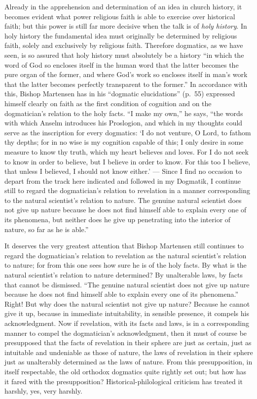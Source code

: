 \documentclass[12pt]{book}
\newcommand{\opage}[1]{\marginnote{\footnotesize\textit{[#1]}}}
\begin{document}
Already in the apprehension and determination of an idea in church history, it becomes evident what power religious faith is able to exercise over historical faith; but this power is still far more decisive when the talk is of \emph{holy history}. In holy history the fundamental idea must originally be determined by religious faith, solely and exclusively by religious faith. Therefore dogmatics, as we have seen, is so assured that holy history must absolutely be a history ``in which the word of God so encloses itself in the human word that the latter becomes the pure organ of the former, and where God's work so encloses itself in man's work that the latter becomes perfectly
\opage{45}\setcounter{footnote}{0}%
transparent to the former.'' In accordance with this, Bishop Martensen has in his ``dogmatic elucidations'' (p.~55) expressed himself clearly on faith as the first condition of cognition and on the dogmatician's relation to the holy facts. ``I make my own,'' he says, ``the words with which Anselm introduces his Proslogion, and which in my thoughts could serve as the inscription for every dogmatics: `I do not venture, O Lord, to fathom thy depths; for in no wise is my cognition capable of this; I only desire in some measure to know thy truth, which my heart believes and loves. For I do not seek to know in order to believe, but I believe in order to know. For this too I believe, that unless I believed, I should not know either.' --- Since I find no occasion to depart from the track here indicated and followed in my Dogmatik, I continue still to regard the dogmatician's relation to revelation in a manner corresponding to the natural scientist's relation to nature. The genuine natural scientist does not give up nature because he does not find himself able to explain every one of its phenomena, but neither does he give up penetrating into the interior of nature, so far as he is able.''

It deserves the very greatest attention that Bishop Martensen still continues to regard the dogmatician's relation to revelation as the natural scientist's relation to nature; for from this one sees how sure he is of the holy facts. By what is the natural scientist's relation to nature determined? By unalterable laws, by facts that cannot be dismissed. ``The genuine natural scientist does not give up nature because he does not find himself able to explain every one of its phenomena.'' Right! But why does the natural scientist not give up nature? Because he cannot give it up, because in immediate intuitability, in sensible presence, it compels his acknowledgment. Now if revelation, with its facts and laws, is in a corresponding manner to compel
\opage{46}\setcounter{footnote}{0}%
the dogmatician's acknowledgment, then it must of course be presupposed that the facts of revelation in their sphere are just as certain, just as intuitable and undeniable as those of nature, the laws of revelation in their sphere just as unalterably determined as the laws of nature. From this presupposition, in itself respectable, the old orthodox dogmatics quite rightly set out; but how has it fared with the presupposition? Historical-philological criticism has treated it harshly, yes, very harshly.
\end{document}
